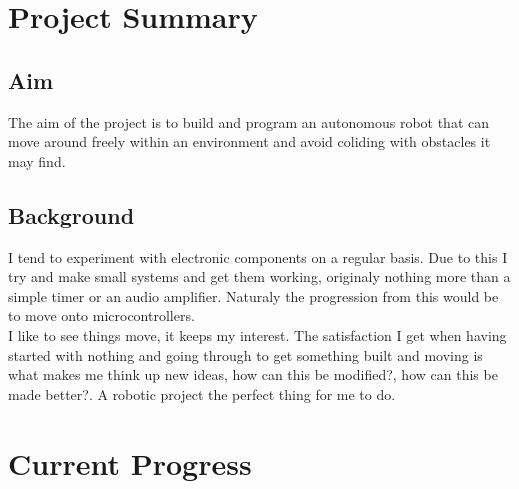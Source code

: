 \documentclass[11pt,fleqn,twoside]{article}
\begin{document}
\wordcount{}

\mmp

\setcounter{tocdepth}{3} %
\tableofcontents

\newpage

\section{Project Summary}
\subsection{Aim}
The aim of the project is to build and program an autonomous robot that can move around freely within an environment and avoid coliding with obstacles it may find.
\subsection{Background}
I tend to experiment with electronic components on a regular basis.  Due to this I try and make small systems and get them working, originaly nothing more than a simple timer or an audio amplifier.  Naturaly the progression from this would be to move onto microcontrollers.
\\I like to see things move, it keeps my interest.  The satisfaction I get when having started with nothing and going through to get something built and moving is what makes me think up new ideas, how can this be modified?, how can this be made better?.  A robotic project the perfect thing for me to do.
\\

\section{Current Progress}
\end{document}
